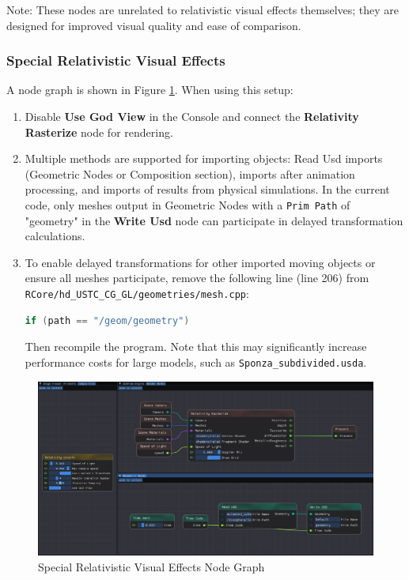 \documentclass{article}
\begin{document}
Note: These nodes are unrelated to relativistic visual effects themselves; they are designed for improved visual quality and ease of comparison.

\subsubsection*{Special Relativistic Visual Effects}
A node graph is shown in Figure \ref{view}. When using this setup:
\begin{enumerate}[(1)]
    \item Disable \textbf{Use God View} in the Console and connect the \textbf{Relativity Rasterize} node for rendering.
    \item Multiple methods are supported for importing objects: Read Usd imports (Geometric Nodes or Composition section), imports after animation processing, and imports of results from physical simulations. In the current code, only meshes output in Geometric Nodes with a \lstinline|Prim Path| of "geometry" in the \textbf{Write Usd} node can participate in delayed transformation calculations. 
    \item To enable delayed transformations for other imported moving objects or ensure all meshes participate, remove the following line (line 206) from \lstinline|RCore/hd_USTC_CG_GL/geometries/mesh.cpp|:
\begin{lstlisting}[language=C++, title=mesh.cpp, firstnumber=206]
    if (path == "/geom/geometry")
\end{lstlisting}
        Then recompile the program. Note that this may significantly increase performance costs for large models, such as \lstinline|Sponza_subdivided.usda|.
\end{enumerate}

\begin{figure}[htbp]
    \centering
    \setlength{\abovecaptionskip}{0.cm}
    \begin{minipage}[b]{0.85\linewidth}
        \centering
        \includegraphics[width=\textwidth]{View.png}
        \caption{Special Relativistic Visual Effects Node Graph}
        \label{view}
    \end{minipage}
\end{figure}
\end{document}
